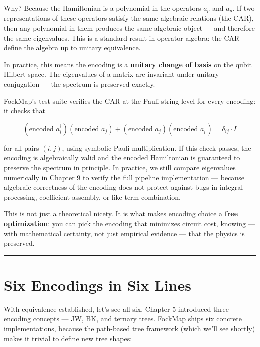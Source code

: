 \documentclass[
  11pt,
  oneside]{book}
\begin{document}
Why? Because the Hamiltonian is a polynomial in the operators
\(a_p^\dagger\) and \(a_p\). If two representations of these operators
satisfy the same algebraic relations (the CAR), then any polynomial in
them produces the same algebraic object --- and therefore the same
eigenvalues. This is a standard result in operator algebra: the CAR
define the algebra up to unitary equivalence.

In practice, this means the encoding is a \textbf{unitary change of
basis} on the qubit Hilbert space. The eigenvalues of a matrix are
invariant under unitary conjugation --- the spectrum is preserved
exactly.

FockMap's test suite verifies the CAR at the Pauli string level for
every encoding: it checks that

\[(\text{encoded } a_i^\dagger)(\text{encoded } a_j) + (\text{encoded } a_j)(\text{encoded } a_i^\dagger) = \delta_{ij} \cdot I\]

for all pairs \((i, j)\), using symbolic Pauli multiplication. If this
check passes, the encoding is algebraically valid and the encoded
Hamiltonian is guaranteed to preserve the spectrum in principle. In
practice, we still compare eigenvalues numerically in Chapter 9 to
verify the full pipeline implementation --- because algebraic
correctness of the encoding does not protect against bugs in integral
processing, coefficient assembly, or like-term combination.

This is not just a theoretical nicety. It is what makes encoding choice
a \textbf{free optimization}: you can pick the encoding that minimizes
circuit cost, knowing --- with mathematical certainty, not just
empirical evidence --- that the physics is preserved.

\begin{center}\rule{0.5\linewidth}{0.5pt}\end{center}

\section{Six Encodings in Six Lines}\label{six-encodings-in-six-lines}

With equivalence established, let's see all six. Chapter 5 introduced
three encoding concepts --- JW, BK, and ternary trees. FockMap ships six
concrete implementations, because the path-based tree framework (which
we'll see shortly) makes it trivial to define new tree shapes:
\end{document}
